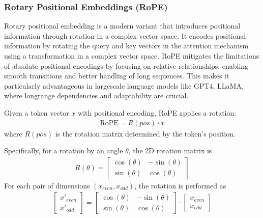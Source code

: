 \documentclass[letterpaper,11pt,english]{sphinxmanual}
\begin{document}
\subsubsection{Rotary Positional Embeddings (RoPE)}
\label{\detokenize{pretraining:rotary-positional-embeddings-rope}}
\sphinxAtStartPar
Rotary positional embedding is a modern variant that introduces
positional information through rotation in a complex vector space. It
encodes positional information by rotating the query and key vectors in
the attention mechanism using a transformation in a complex vector
space. RoPE mitigates the limitations of absolute positional encodings
by focusing on relative relationships, enabling smooth transitions and
better handling of long sequences. This makes it particularly
advantageous in large\sphinxhyphen{}scale language models like GPT\sphinxhyphen{}4, LLaMA, where
long\sphinxhyphen{}range dependencies and adaptability are crucial.

\sphinxAtStartPar
Given a token vector \(x\) with positional encoding, RoPE applies a
rotation:
\begin{equation*}
\begin{split}\text{RoPE} = R(pos)\cdot x\end{split}
\end{equation*}
\sphinxAtStartPar
where \(R(pos)\) is the rotation matrix determined by the token’s
position.

\sphinxAtStartPar
Specifically, for a rotation by an angle \(\theta\), the 2D rotation
matrix is
\begin{equation*}
\begin{split}R(\theta) = \begin{bmatrix} \cos(\theta) & -\sin(\theta) \\ \sin(\theta) & \cos(\theta)\end{bmatrix}\end{split}
\end{equation*}
\sphinxAtStartPar
For each pair of dimensions \((x_{even}, x_{odd})\), the rotation is
performed as
\begin{equation*}
\begin{split}\begin{bmatrix}x'_{even} \\x'_{odd} \end{bmatrix} = \begin{bmatrix} \cos(\theta) & -\sin(\theta) \\ \sin(\theta) & \cos(\theta)\end{bmatrix} \cdot \begin{bmatrix}x_{even} \\x_{odd} \end{bmatrix}\end{split}
\end{equation*}
\end{document}
